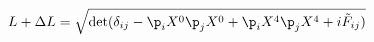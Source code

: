 \begin{equation}
L + \Delta L=\sqrt{\textup{det} (\delta_{ij} - \p_i X^0 \p_j X^0 +
\p_i X^4 \p_j X^4 + i \tilde{F}_{ij} )} \label{imaginaryFaction}
\end{equation}


